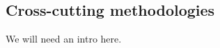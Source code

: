 
\begin{partbacktext}
\part{Cross-cutting methodologies}

 We will need an intro here.

\end{partbacktext}